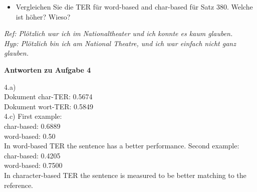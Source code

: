 \documentclass[12pt,fleqn]{article}
\begin{document}
\begin{enumerate}
\begin{enumerate}
\vspace{0.5cm} 
\begin{itemize} 
 \item Vergleichen Sie die TER für word-based and char-based für Satz 380. Welche ist höher? Wieso?
\end{itemize}
\vspace{0.5cm} 
\textit{Ref: Plötzlich war ich im Nationaltheater und ich konnte es kaum glauben. } \\ 
\textit{Hyp: Plötzlich bin ich am National Theatre, und ich war einfach nicht ganz glauben. } \\ 

\end{enumerate}

\textbf{Antworten zu Aufgabe 4} 

\vspace{0.5cm} 
4.a) \\ 
Dokument char-TER: 0.5674 \\ 
Dokument wort-TER: 0.5849 \\ 

\vspace{0.5cm} 
4.c) 
First example: \\ 
char-based: 0.6889 \\ 
word-based: 0.50 \\ 
In word-based TER the sentence has a better performance. 
\vspace{0.5cm} 
Second example: \\ 
char-based: 0.4205 \\ 
word-based: 0.7500 \\ 
In character-based TER the sentence is measured to be better matching to the reference. \\ 

\end{enumerate}



\newpage



\end{document}
